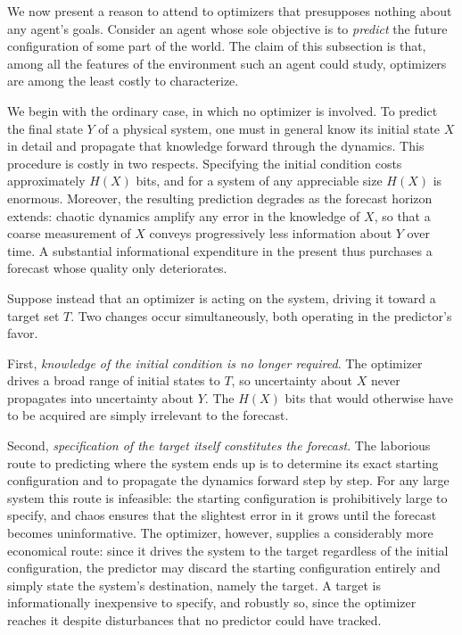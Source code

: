 \documentclass[11pt]{article}
\begin{document}
We now present a reason to attend to optimizers that presupposes nothing about any agent's goals. Consider an agent whose sole objective is to \emph{predict} the future configuration of some part of the world. The claim of this subsection is that, among all the features of the environment such an agent could study, optimizers are among the least costly to characterize.

We begin with the ordinary case, in which no optimizer is involved. To predict the final state $Y$ of a physical system, one must in general know its initial state $X$ in detail and propagate that knowledge forward through the dynamics. This procedure is costly in two respects. Specifying the initial condition costs approximately $H(X)$ bits, and for a system of any appreciable size $H(X)$ is enormous. Moreover, the resulting prediction degrades as the forecast horizon extends: chaotic dynamics amplify any error in the knowledge of $X$, so that a coarse measurement of $X$ conveys progressively less information about $Y$ over time. A substantial informational expenditure in the present thus purchases a forecast whose quality only deteriorates.

Suppose instead that an optimizer is acting on the system, driving it toward a target set $T$. Two changes occur simultaneously, both operating in the predictor's favor.

First, \emph{knowledge of the initial condition is no longer required}. The optimizer drives a broad range of initial states to $T$, so uncertainty about $X$ never propagates into uncertainty about $Y$. The $H(X)$ bits that would otherwise have to be acquired are simply irrelevant to the forecast.

Second, \emph{specification of the target itself constitutes the forecast}. The laborious route to predicting where the system ends up is to determine its exact starting configuration and to propagate the dynamics forward step by step. For any large system this route is infeasible: the starting configuration is prohibitively large to specify, and chaos ensures that the slightest error in it grows until the forecast becomes uninformative. The optimizer, however, supplies a considerably more economical route: since it drives the system to the target regardless of the initial configuration, the predictor may discard the starting configuration entirely and simply state the system's destination, namely the target. A target is informationally inexpensive to specify, and robustly so, since the optimizer reaches it despite disturbances that no predictor could have tracked.
\end{document}
